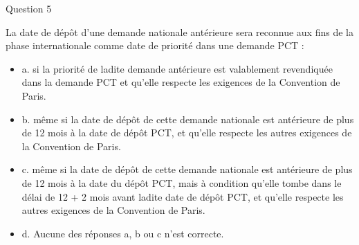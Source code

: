 \begin{frame}{Question 5}

\begin{block}{}
La date de dépôt d’une demande nationale antérieure sera reconnue aux fins de la 
phase internationale comme date de priorité dans une demande PCT :

\begin{itemize}
  \item[$\bullet$] a. si la priorité de ladite demande antérieure est valablement revendiquée dans la 
  demande PCT et qu’elle respecte les exigences de la Convention de Paris. 
  \item[$\circ$] b. même si la date de dépôt de cette demande nationale est antérieure de plus de 12 
  mois à la date de dépôt PCT, et qu’elle respecte les autres exigences de la 
  Convention de Paris. 
  \item[$\bullet$] c. même si la date de dépôt de cette demande nationale est antérieure de plus de 12 
  mois à la date du dépôt PCT, mais à condition qu’elle tombe dans le délai de 12 + 2 
  mois avant ladite date de dépôt PCT, et qu’elle respecte les autres exigences de la 
  Convention de Paris. 
  \item[$\circ$] d. Aucune des réponses a, b ou c n’est correcte. 
\end{itemize}

\end{block}

\end{frame}






